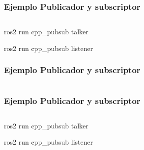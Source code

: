 \begin{frame}[fragile]
	\frametitle{Ejemplo Publicador y subscriptor}
    
    \begin{columns}
        \begin{column}{0.5\textwidth}
            
        \end{column}
        \begin{column}{0.5\textwidth}
            
        \end{column}
    \end{columns}
	
	ros2 run cpp\_pubsub talker
	
	ros2 run cpp\_pubsub listener
	
\end{frame}

\begin{frame}[fragile]
    \frametitle{Ejemplo Publicador y subscriptor}
    
    \begin{columns}
        \begin{column}{0.5\textwidth}
            
        \end{column}
        \begin{column}{0.5\textwidth}
            
        \end{column}
    \end{columns}
    
\end{frame}

\begin{frame}[fragile]
    \frametitle{Ejemplo Publicador y subscriptor}
    
    \begin{columns}
        \begin{column}{0.5\textwidth}
            
        \end{column}
        \begin{column}{0.5\textwidth}
            
        \end{column}
    \end{columns}
    
    ros2 run cpp\_pubsub talker
    
    ros2 run cpp\_pubsub listener
    
\end{frame}


